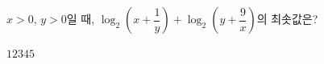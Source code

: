 $x>0$, $y>0$일 때, $\log_2\!\left(x+\dfrac{1}{y}\right)+\log_2\!\left(y+\dfrac{9}{x}\right)$의 최솟값은?
\begin{choices32}{$1$}{$2$}{$3$}{$4$}{$5$}\end{choices32}
